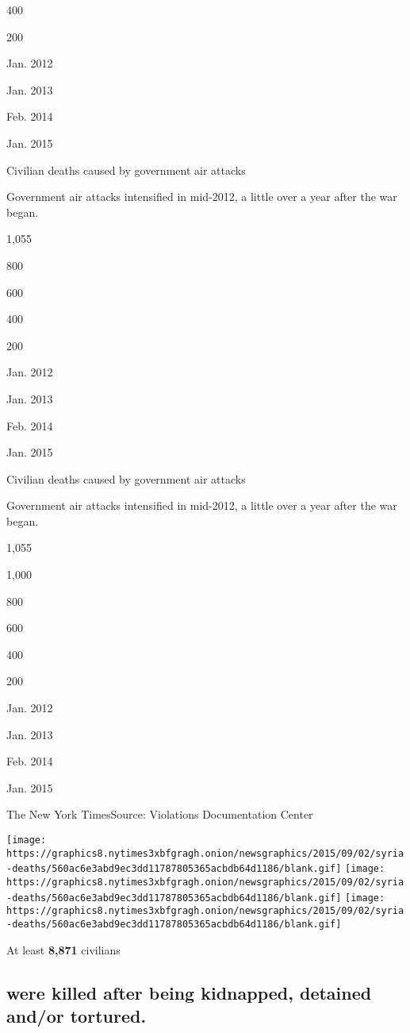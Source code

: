 400

200

Jan. 2012

Jan. 2013

Feb. 2014

Jan. 2015

Civilian deaths caused by government air attacks

Government air attacks intensified in mid-2012, a little over a year
after the war began.

1,055

800

600

400

200

Jan. 2012

Jan. 2013

Feb. 2014

Jan. 2015

Civilian deaths caused by government air attacks

Government air attacks intensified in mid-2012, a little over a year
after the war began.

1,055

1,000

800

600

400

200

Jan. 2012

Jan. 2013

Feb. 2014

Jan. 2015

The New York Times\textbar{}Source: Violations Documentation Center

\texttt{[image: https://graphics8.nytimes3xbfgragh.onion/newsgraphics/2015/09/02/syria-deaths/560ac6e3abd9ec3dd11787805365acbdb64d1186/blank.gif]}
\texttt{[image: https://graphics8.nytimes3xbfgragh.onion/newsgraphics/2015/09/02/syria-deaths/560ac6e3abd9ec3dd11787805365acbdb64d1186/blank.gif]}
\texttt{[image: https://graphics8.nytimes3xbfgragh.onion/newsgraphics/2015/09/02/syria-deaths/560ac6e3abd9ec3dd11787805365acbdb64d1186/blank.gif]}

At least \textbf{8,871} civilians

\hypertarget{were-killed-after-being-kidnapped-detained-andor-tortured}{%
\subsection{were killed after being kidnapped, detained and/or
tortured.}\label{were-killed-after-being-kidnapped-detained-andor-tortured}}

